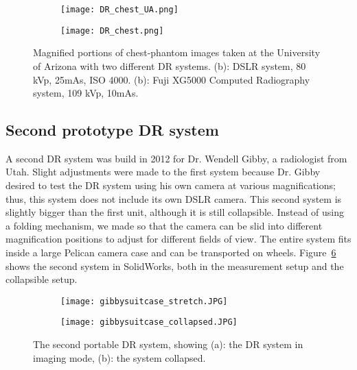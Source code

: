 \begin{figure}[h]
\centering
	\begin{subfigure}[b]{0.45\linewidth}
	\centering
	\texttt{[image: DR\_chest\_UA.png]}
	\caption{}
	\label{fig:DR_chest_film}
	\end{subfigure}
	\hspace{1 cm}
	\begin{subfigure}[b]{0.45\linewidth}
	\texttt{[image: DR\_chest.png]}
	\caption{}
	\label{fig:DR_chest}
	\end{subfigure}
\caption{Magnified portions of chest-phantom images taken at the University of Arizona with two different DR systems. (b): DSLR system, 80 kVp, 25mAs, ISO 4000. (b): Fuji XG5000 Computed Radiography system, 109 kVp, 10mAs.}
\label{fig:DR_chest_both}
\end{figure}

\subsection{Second prototype DR system}
A second DR system was build in 2012 for Dr. Wendell Gibby, a radiologist from Utah.  Slight adjustments were made to the first system because Dr. Gibby desired to test the DR system using his own camera at various magnifications; thus, this system does not include its own DSLR camera.  This second system is slightly bigger than the first unit, although it is still collapsible.  Instead of using a folding mechanism, we made so that the camera can be slid into different magnification positions to adjust for different fields of view.  The entire system fits inside a large Pelican camera case and can be transported on wheels.  Figure~\ref{fig:DR2} shows the second system in SolidWorks, both in the measurement setup and the collapsible setup.

\begin{figure}[h]
	\begin{subfigure}[b]{0.45\linewidth}
	\centering
	\texttt{[image: gibbysuitcase\_stretch.JPG]}
	\caption{}
	\label{DR2stretched}
	\end{subfigure}
\hspace{0.2cm}
	\begin{subfigure}[b]{0.45\linewidth}
	\centering
	\texttt{[image: gibbysuitcase\_collapsed.JPG]}
	\caption{}
	\label{fig:DR2collapsed}
	\end{subfigure}
\caption{The second portable DR system, showing (a): the DR system in imaging mode, (b): the system collapsed.}
\label{fig:DR2}	
\end{figure}

